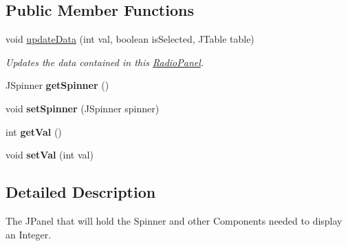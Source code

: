 \subsection*{Public Member Functions}
\begin{DoxyCompactItemize}
\item 
void \hyperlink{classedu_1_1udel_1_1cis_1_1vsl_1_1civl_1_1gui_1_1common_1_1IntegerPanel_abc733ffb13c56b4a5599c2574de618e6}{update\+Data} (int val, boolean is\+Selected, J\+Table table)
\begin{DoxyCompactList}\small\item\em Updates the data contained in this {\ttfamily \hyperlink{classedu_1_1udel_1_1cis_1_1vsl_1_1civl_1_1gui_1_1common_1_1RadioPanel}{Radio\+Panel}}. \end{DoxyCompactList}\item 
\hypertarget{classedu_1_1udel_1_1cis_1_1vsl_1_1civl_1_1gui_1_1common_1_1IntegerPanel_ae98aad45e4a1a51b6af5ad0fccc2eaf5}{}J\+Spinner {\bfseries get\+Spinner} ()\label{classedu_1_1udel_1_1cis_1_1vsl_1_1civl_1_1gui_1_1common_1_1IntegerPanel_ae98aad45e4a1a51b6af5ad0fccc2eaf5}

\item 
\hypertarget{classedu_1_1udel_1_1cis_1_1vsl_1_1civl_1_1gui_1_1common_1_1IntegerPanel_ae3d3c8dabe323f252b57b3273acb950b}{}void {\bfseries set\+Spinner} (J\+Spinner spinner)\label{classedu_1_1udel_1_1cis_1_1vsl_1_1civl_1_1gui_1_1common_1_1IntegerPanel_ae3d3c8dabe323f252b57b3273acb950b}

\item 
\hypertarget{classedu_1_1udel_1_1cis_1_1vsl_1_1civl_1_1gui_1_1common_1_1IntegerPanel_adf03d83f3b5f80fc66c05954302f3fb2}{}int {\bfseries get\+Val} ()\label{classedu_1_1udel_1_1cis_1_1vsl_1_1civl_1_1gui_1_1common_1_1IntegerPanel_adf03d83f3b5f80fc66c05954302f3fb2}

\item 
\hypertarget{classedu_1_1udel_1_1cis_1_1vsl_1_1civl_1_1gui_1_1common_1_1IntegerPanel_aaa1ea0bdf4f2a9aa2926f6cd600abd98}{}void {\bfseries set\+Val} (int val)\label{classedu_1_1udel_1_1cis_1_1vsl_1_1civl_1_1gui_1_1common_1_1IntegerPanel_aaa1ea0bdf4f2a9aa2926f6cd600abd98}

\end{DoxyCompactItemize}


\subsection{Detailed Description}
The J\+Panel that will hold the Spinner and other Components needed to display an Integer. 

